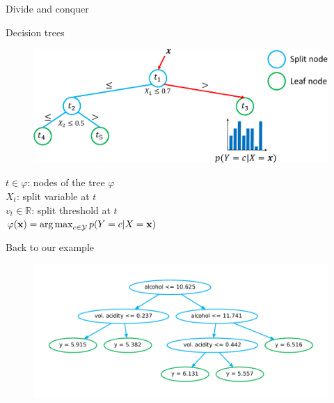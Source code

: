 \documentclass{beamer}
\DeclareMathOperator*{\argmax}{arg\,max}
\begin{document}
\begin{frame}{Divide and conquer}
\begin{figure}
\end{figure}
\end{frame}

\begin{frame}{Decision trees}
\begin{figure}
\includegraphics[scale=0.5]{./figures/tree-simple.pdf}
\end{figure}

$t \in \varphi$: nodes of the tree $\varphi$\\
$X_t$: split variable at $t$ \\
$v_t \in \mathbb{R}$: split threshold at $t$\\
$\varphi(\mathbf{x}) = \argmax_{c \in {\cal Y}} p(Y = c | X = \mathbf{x})$
\end{frame}

\begin{frame}{Back to our example}
\begin{figure}
\includegraphics[scale=0.4]{./figures/tree-wine.pdf}
\end{figure}
\end{frame}

\end{document}
